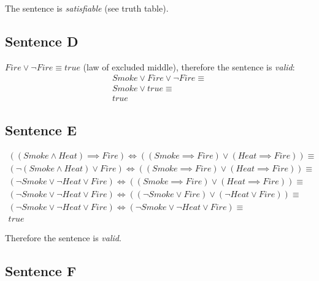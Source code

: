 The sentence is \textit{satisfiable} (see truth table).

\subsection*{Sentence D}

$Fire \lor \neg Fire \equiv true$ (law of excluded middle), therefore the sentence is \textit{valid}:
\smallskip
\begin{gather*}
Smoke \lor Fire \lor \neg Fire \equiv \\
Smoke \lor true \equiv \\
true
\end{gather*}

\subsection*{Sentence E}

\begin{gather*}
((Smoke \land Heat) \implies Fire) \iff ((Smoke \implies Fire) \lor (Heat \implies Fire)) \equiv \\
(\neg(Smoke \land Heat) \lor Fire) \iff ((Smoke \implies Fire) \lor (Heat \implies Fire)) \equiv \\
(\neg Smoke \lor \neg Heat \lor Fire) \iff ((Smoke \implies Fire) \lor (Heat \implies Fire)) \equiv \\
(\neg Smoke \lor \neg Heat \lor Fire) \iff ((\neg Smoke \lor Fire) \lor (\neg Heat \lor Fire)) \equiv \\
(\neg Smoke \lor \neg Heat \lor Fire) \iff (\neg Smoke \lor \neg Heat \lor Fire) \equiv \\
true
\end{gather*}

Therefore the sentence is \textit{valid}.

\subsection*{Sentence F}

